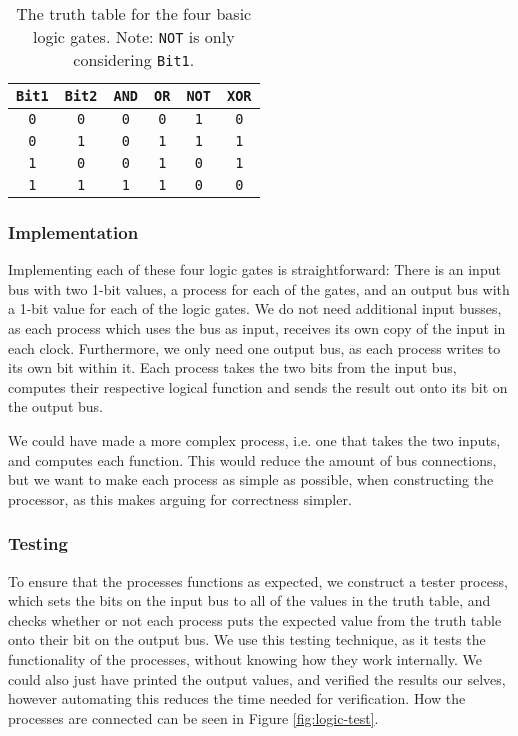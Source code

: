 \begin{table}
    \centering
    \begin{tabular}{cc|cccc}
        \toprule
        \texttt{Bit1} & \texttt{Bit2} & \texttt{AND} & \texttt{OR} &
        \texttt{NOT} & \texttt{XOR} \\
        \midrule
        \texttt{0} & \texttt{0} & \texttt{0} & \texttt{0} & \texttt{1} &
            \texttt{0} \\
        \texttt{0} & \texttt{1} & \texttt{0} & \texttt{1} & \texttt{1} &
            \texttt{1} \\
        \texttt{1} & \texttt{0} & \texttt{0} & \texttt{1} & \texttt{0} &
            \texttt{1} \\
        \texttt{1} & \texttt{1} & \texttt{1} & \texttt{1} & \texttt{0} &
            \texttt{0} \\
        \bottomrule
    \end{tabular}
    \caption{The truth table for the four basic logic gates. Note: \texttt{NOT}
    is only considering \texttt{Bit1}.}
    \label{tab:truth-table}
\end{table}

\subsubsection*{Implementation}
Implementing each of these four logic gates is straightforward: There is an
input bus with two 1-bit values, a process for each of the gates, and an output
bus with a 1-bit value for each of the logic gates. We do not need additional
input busses, as each process which uses the bus as input, receives its own
copy of the input in each clock. Furthermore, we only need one output bus, as
each process writes to its own bit within it. Each process takes the two bits
from the input bus, computes their respective logical function and sends the
result out onto its bit on the output bus.

We could have made a more complex process, i.e. one that takes the two inputs,
and computes each function. This would reduce the amount of bus connections,
but we want to make each process as simple as possible, when constructing the
processor, as this makes arguing for correctness simpler.

\subsubsection*{Testing}
To ensure that the processes functions as expected, we construct a tester
process, which sets the bits on the input bus to all of the values in the truth
table, and checks whether or not each process puts the expected value from the
truth table onto their bit on the output bus. We use this testing technique, as
it tests the functionality of the processes, without knowing how they work
internally. We could also just have printed the output values, and verified the
results our selves, however automating this reduces the time needed for
verification. How the processes are connected can be seen in Figure
\ref{fig:logic-test}.

